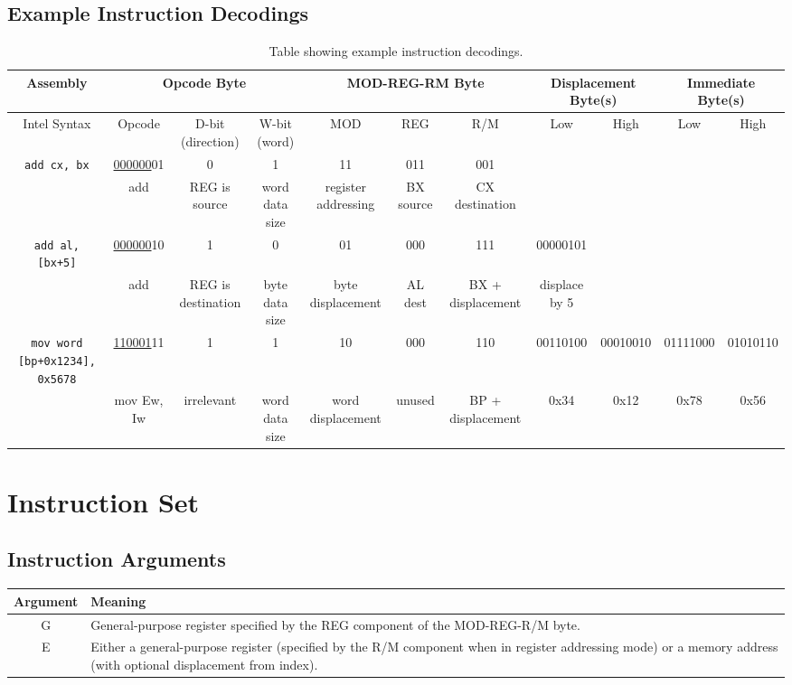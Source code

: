 \begin{landscape} \section{Example Instruction Decodings}
	\begin{table}[h]
		\resizebox{0.87\paperheight}{!} {\begin{tabular} { |*{11}{c|} } %
			\hline
			Assembly & \multicolumn{3}{c}{Opcode Byte} & \multicolumn{3}{|c}{MOD-REG-RM Byte} & \multicolumn{2}{|c}{Displacement Byte(s)} & \multicolumn{2}{|c|}{Immediate Byte(s)} \\
			\hline
			Intel Syntax 							& Opcode 				& D-bit (direction)		& W-bit (word)			& MOD 					& REG 			& R/M 				& Low 			& High 		& Low 		& High \\
			\hline
			\texttt{add cx, bx} 					& \underline{000000}01	& 0						& 1						& 11 					& 011 			& 001				& & & & \\
													& add 					& REG is source 		& word data size	 	& register addressing 	& BX source 	& CX destination 	& & & & \\
			\hline
			\texttt{add al, [bx+5]}					& \underline{000000}10	& 1						& 0						& 01					& 000			& 111				& 00000101		& & & \\
													& add 					& REG is destination 	& byte data size		& byte displacement 	& AL dest		& BX + displacement & displace by 5 & & & \\
			\hline
			\texttt{mov word [bp+0x1234], 0x5678}	& \underline{110001}11	& 1						& 1						& 10					& 000			& 110				& 00110100		& 00010010	& 01111000	& 01010110 \\
													& mov Ew, Iw			& irrelevant		 	& word data size		& word displacement 	& unused 		& BP + displacement & 0x34 			& 0x12 		& 0x78 		& 0x56 \\
			\hline
		\end{tabular}}
		\caption{Table showing example instruction decodings.}
	\end{table}
\end{landscape}

\section{Instruction Set}
    \subsection{Instruction Arguments}
	\begin{table}[h]
		\begin{tabular} { | c | m{} | }
			\hline
			Argument & Meaning \\
			\hline
			G & General-purpose register specified by the REG component of the MOD-REG-R/M byte. \\
			\hline
			E & Either a general-purpose register (specified by the R/M component when in register addressing mode) or a memory address (with optional displacement from index). \\
			\hline
		\end{tabular}
	\end{table}

